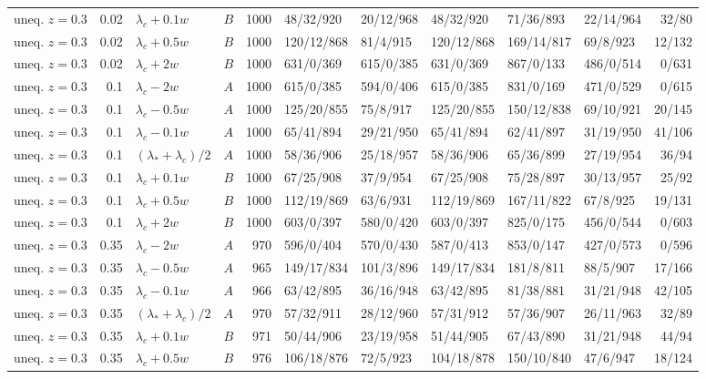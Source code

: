 \begin{longtable}{@{}lrllrlllllr@{}}
uneq. $z{=}0.3$ & 0.02 & $\lambda_c+0.1w$ & $B$ & 1000 & 48/32/920 & 20/12/968 & 48/32/920 & 71/36/893 & 22/14/964 & 32/80\\
uneq. $z{=}0.3$ & 0.02 & $\lambda_c+0.5w$ & $B$ & 1000 & 120/12/868 & 81/4/915 & 120/12/868 & 169/14/817 & 69/8/923 & 12/132\\
uneq. $z{=}0.3$ & 0.02 & $\lambda_c+2w$ & $B$ & 1000 & 631/0/369 & 615/0/385 & 631/0/369 & 867/0/133 & 486/0/514 & 0/631\\
uneq. $z{=}0.3$ & 0.1 & $\lambda_c-2w$ & $A$ & 1000 & 615/0/385 & 594/0/406 & 615/0/385 & 831/0/169 & 471/0/529 & 0/615\\
uneq. $z{=}0.3$ & 0.1 & $\lambda_c-0.5w$ & $A$ & 1000 & 125/20/855 & 75/8/917 & 125/20/855 & 150/12/838 & 69/10/921 & 20/145\\
uneq. $z{=}0.3$ & 0.1 & $\lambda_c-0.1w$ & $A$ & 1000 & 65/41/894 & 29/21/950 & 65/41/894 & 62/41/897 & 31/19/950 & 41/106\\
uneq. $z{=}0.3$ & 0.1 & $(\lambda_*+\lambda_c)/2$ & $A$ & 1000 & 58/36/906 & 25/18/957 & 58/36/906 & 65/36/899 & 27/19/954 & 36/94\\
uneq. $z{=}0.3$ & 0.1 & $\lambda_c+0.1w$ & $B$ & 1000 & 67/25/908 & 37/9/954 & 67/25/908 & 75/28/897 & 30/13/957 & 25/92\\
uneq. $z{=}0.3$ & 0.1 & $\lambda_c+0.5w$ & $B$ & 1000 & 112/19/869 & 63/6/931 & 112/19/869 & 167/11/822 & 67/8/925 & 19/131\\
uneq. $z{=}0.3$ & 0.1 & $\lambda_c+2w$ & $B$ & 1000 & 603/0/397 & 580/0/420 & 603/0/397 & 825/0/175 & 456/0/544 & 0/603\\
uneq. $z{=}0.3$ & 0.35 & $\lambda_c-2w$ & $A$ & 970 & 596/0/404 & 570/0/430 & 587/0/413 & 853/0/147 & 427/0/573 & 0/596\\
uneq. $z{=}0.3$ & 0.35 & $\lambda_c-0.5w$ & $A$ & 965 & 149/17/834 & 101/3/896 & 149/17/834 & 181/8/811 & 88/5/907 & 17/166\\
uneq. $z{=}0.3$ & 0.35 & $\lambda_c-0.1w$ & $A$ & 966 & 63/42/895 & 36/16/948 & 63/42/895 & 81/38/881 & 31/21/948 & 42/105\\
uneq. $z{=}0.3$ & 0.35 & $(\lambda_*+\lambda_c)/2$ & $A$ & 970 & 57/32/911 & 28/12/960 & 57/31/912 & 57/36/907 & 26/11/963 & 32/89\\
uneq. $z{=}0.3$ & 0.35 & $\lambda_c+0.1w$ & $B$ & 971 & 50/44/906 & 23/19/958 & 51/44/905 & 67/43/890 & 31/21/948 & 44/94\\
uneq. $z{=}0.3$ & 0.35 & $\lambda_c+0.5w$ & $B$ & 976 & 106/18/876 & 72/5/923 & 104/18/878 & 150/10/840 & 47/6/947 & 18/124\\

\end{longtable}
